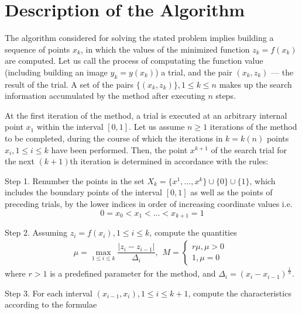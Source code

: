 \documentclass[procedia]{easychair}
\begin{document}
\section{Description of the Algorithm}
\label{sect:algorithm}

The algorithm considered for solving the stated problem implies building
a sequence of points \(x_k\), in which the values of the minimized function \(z_k = f(x_k)\)
are computed. Let us call the process of computating the function value
(including building an image \(y_k=y(x_k)\)) a trial, and the pair \((x_k,z_k)\) ---
the result of the trial. A set of the pairs \(\{(x_k,z_k)\}, 1\leqslant k\leqslant n\)
makes up the search information accumulated by the method after executing \(n\) steps.
\par
At the first iteration of the method, a trial is executed at an arbitrary internal
point \(x_1\) within the interval \([0,1]\). Let us assume \(n \geqslant 1\) iterations
of the method to be completed, during the course of which the iterations in \(k = k(n)\)
points \(x_i, 1\leqslant i\leqslant k\) have been performed. Then, the point \(x^{k+1}\)
of the search trial for the next \((k+1)\)th iteration is determined in accordance with the rules:
\par
Step 1. Renumber the points in the set \(X_k=\{x^1,\dotsc,x^k\}\cup\{0\}\cup\{1\}\),
which includes the boundary points of the interval \([0,1]\) as well as the points of
preceding trials, by the lower indices in order of increasing coordinate values  i.e.
\begin{displaymath}
0=x_0<x_1<\dotsc<x_{k+1}=1
\end{displaymath}
\par
Step 2. Assuming \(z_i=f(x_i),1\leqslant i\leqslant k\), compute the quantities
\begin{equation}
\label{step2}
\mu=\max_{1\leqslant i\leqslant k}\dfrac{|z_i-z_{i-1}|}{\Delta_i},
\begin{matrix}
    M =
    \left\{
    \begin{matrix}
    r\mu,\mu>0 \\
    1,\mu=0
    \end{matrix} \right.
    \end{matrix}
\end{equation}
where \(r>1\) is a predefined parameter for the method, and \(\Delta_i=(x_i-x_{i-1})^\frac{1}{N}\).
\par
Step 3. For each interval \((x_{i-1},x_i),1\leqslant i\leqslant k+1\), compute the
characteristics according to the formulae
\end{document}
